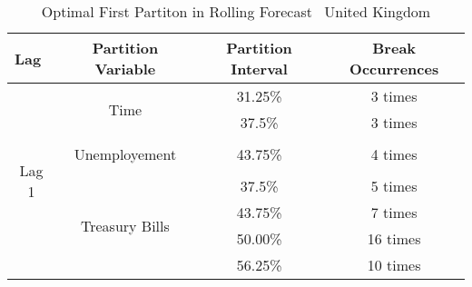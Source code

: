 \begin{table}[t] %
  \centering
  \caption[United Kingdom: GTS-OLS Optimal First Partition Split]{Optimal First Partiton in Rolling Forecast \textendash \ United Kingdom}
  \begin{tabular}{lccc} %
    \cmidrule(r){1-4}
    Lag                                             & Partition Variable                &  Partition Interval       & Break Occurrences \\
    \midrule
    \multicolumn{1}{c|}{\multirow{9}{*}{Lag 1}}     & \multirow{2}{*}{Time}             & 31.25\%                   & 3 times \\
    \multicolumn{1}{c|}{}                           &                                   & 37.5\%                    & 3 times \\
    \multicolumn{1}{c|}{}                           &                                   &                           &          \\    
    \multicolumn{1}{c|}{}                           & Unemployement                     & 43.75\%                   & 4 times \\
    \multicolumn{1}{c|}{}                           &                                   &                           &          \\    
    \multicolumn{1}{c|}{}                           & \multirow{4}{*}{Treasury Bills}   & 37.5\%                    & 5 times \\
    \multicolumn{1}{c|}{}                           &                                   & 43.75\%                   & 7 times  \\
    \multicolumn{1}{c|}{}                           &                                   & 50.00\%                   & 16 times  \\ 
    \multicolumn{1}{c|}{}                           &                                   & 56.25\%                   & 10 times  \\ \cline{1-4}


\end{tabular}
\end{table}
